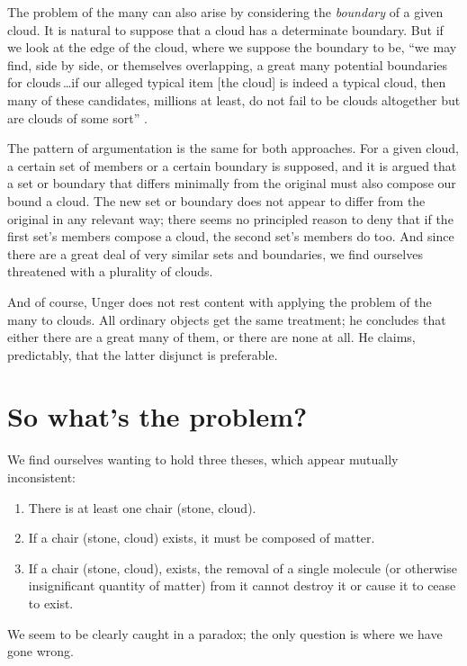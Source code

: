 \documentclass[11pt]{standalone} \newif\ifstandlone \standalonetrue
\begin{document}
\begin{spacing}{1.5}
The problem of the many can also arise by considering the {\em
  boundary} of a given cloud.  It is natural to suppose that a cloud
has a determinate boundary.  But if we look at the edge of the cloud,
where we suppose the boundary to be, ``we may find, side by side, or
themselves overlapping, a great many potential boundaries for
clouds\,\ldots if our alleged typical item {[}the cloud{]} is indeed
a typical cloud, then many of these candidates, millions at least, do
not fail to be clouds altogether but are clouds of some
sort'' \citep[420--421]{unger1980a}.

The pattern of argumentation is the same for both approaches.  For a
given cloud, a certain set of members or a certain boundary is
supposed, and it is argued that a set or boundary that differs
minimally from the original must also compose our bound a cloud.  The
new set or boundary does not appear to differ from the original in any
relevant way; there seems no principled reason to deny that if the
first set's members compose a cloud, the second set's members do too.
And since there are a great deal of very similar sets and boundaries,
we find ourselves threatened with a plurality of clouds.

And of course, Unger does not rest content with applying the problem
of the many to clouds.  All ordinary objects get the same treatment;
he concludes that either there are a great many of them, or there are
none at all.  He claims, predictably, that the latter disjunct is
preferable.

\section{So what's the problem?}
We find ourselves wanting to hold three theses, which appear mutually
inconsistent:

\begin{enumerate}
  \item There is at least one chair (stone, cloud).
  \item If a chair (stone, cloud) exists, it must be composed of
    matter.
  \item If a chair (stone, cloud), exists, the removal of a single
    molecule (or otherwise insignificant quantity of matter) from it
    cannot destroy it or cause it to cease to exist.
\end{enumerate}

We seem to be clearly caught in a paradox; the only question is where
we have gone wrong.


\end{spacing}
\end{document}

